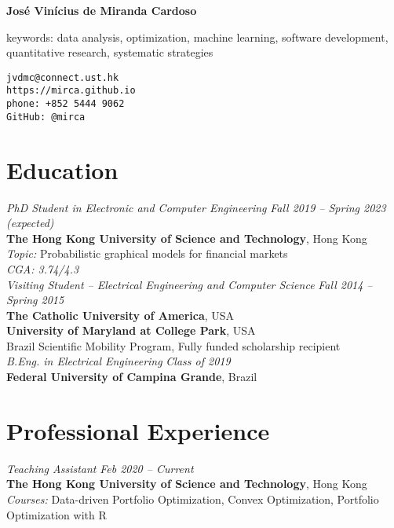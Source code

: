 \documentclass[10pt]{article}
\begin{document}
\pagestyle{empty}
\begin{titlepage}
     {\Large{\textbf{Jos\'e Vin\'icius de Miranda Cardoso}}}
     \vspace{.5cm}

    \begin{minipage}[b]{9cm}
      keywords: data analysis, optimization, machine learning, software development, quantitative research, systematic strategies
    \end{minipage}
    \hfill
    \begin{minipage}[b]{5cm}
        \texttt{jvdmc@connect.ust.hk}\\
        \texttt{https://mirca.github.io}\\
        \texttt{phone: +852 5444 9062}\\
        \texttt{GitHub: @mirca}
    \end{minipage}


\section*{Education}

\emph{PhD Student in Electronic and Computer Engineering} \hfill \textit{Fall 2019 -- Spring 2023 (expected)} \\
\textbf{The Hong Kong University of Science and Technology}, Hong Kong\\
\textit{Topic:} Probabilistic graphical models for financial markets\\
\textit{CGA: 3.74/4.3}\\

\emph{Visiting Student -- Electrical Engineering and Computer Science} \hfill \textit{Fall 2014 -- Spring 2015} \\
\textbf{The Catholic University of America}, USA\\
\textbf{University of Maryland at College Park}, USA \\
Brazil Scientific Mobility Program, Fully funded scholarship recipient \\

\emph{B.Eng. in Electrical Engineering} \hfill \textit{Class of 2019} \\
\textbf{Federal University of Campina Grande}, Brazil

\section*{Professional Experience}


\emph{Teaching Assistant} \hfill \textit{Feb 2020 -- Current}
\\ \textbf{The Hong Kong University of Science and Technology}, Hong Kong
  \\ {\small\textit{Courses:} Data-driven Portfolio Optimization, Convex Optimization, Portfolio Optimization with \textsf{R}}
\vspace{.5cm}


\end{titlepage}
\end{document}
